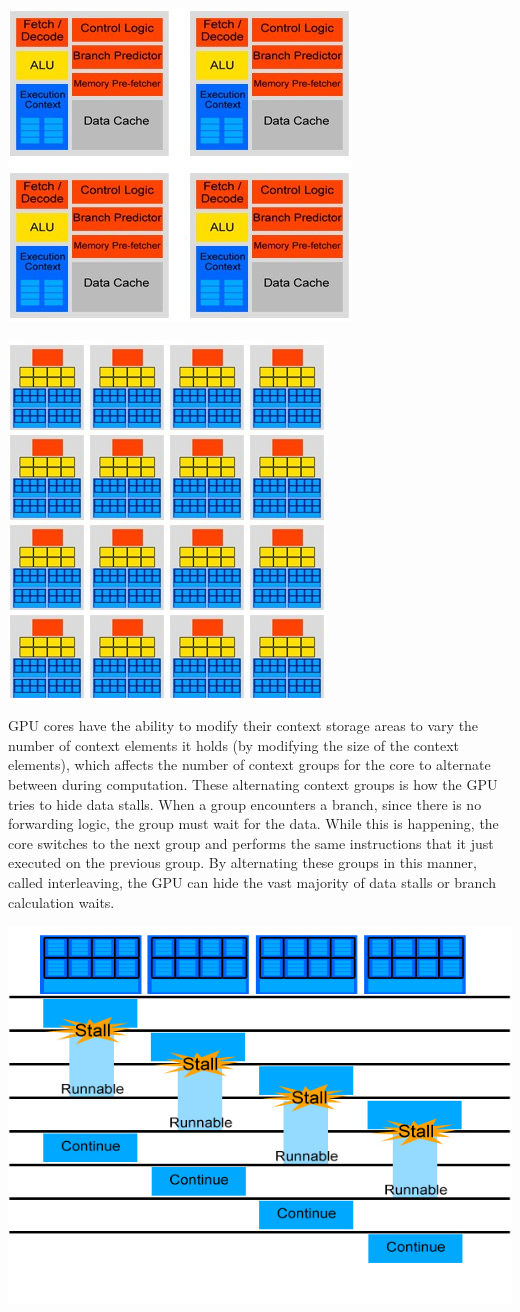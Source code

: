 \documentclass[conference]{IEEEtran}
\begin{document}
\begin{center}
		\includegraphics[width=.2\textwidth]{Multicore-CPU-design.jpg} 
\end{center}

\begin{center}
	\includegraphics[width=.2\textwidth]{GPU-Design---multiple-cores.jpg}
\end{center}

GPU cores have the ability to modify their context storage areas to vary the number of context elements it holds (by modifying the size of the context elements), which affects the number of context groups for the core to alternate between during computation.  These alternating context groups is how the GPU tries to hide data stalls.  When a group encounters a branch, since there is no forwarding logic, the group must wait for the data.  While this is happening, the core switches to the next group and performs the same instructions that it just executed on the previous group.  By alternating these groups in this manner, called interleaving, the GPU can hide the vast majority of data stalls or branch calculation waits.

\begin{center}
	\includegraphics[width=.45\textwidth]{GPU-context-interleaving.jpg}
\end{center}
\end{document}
